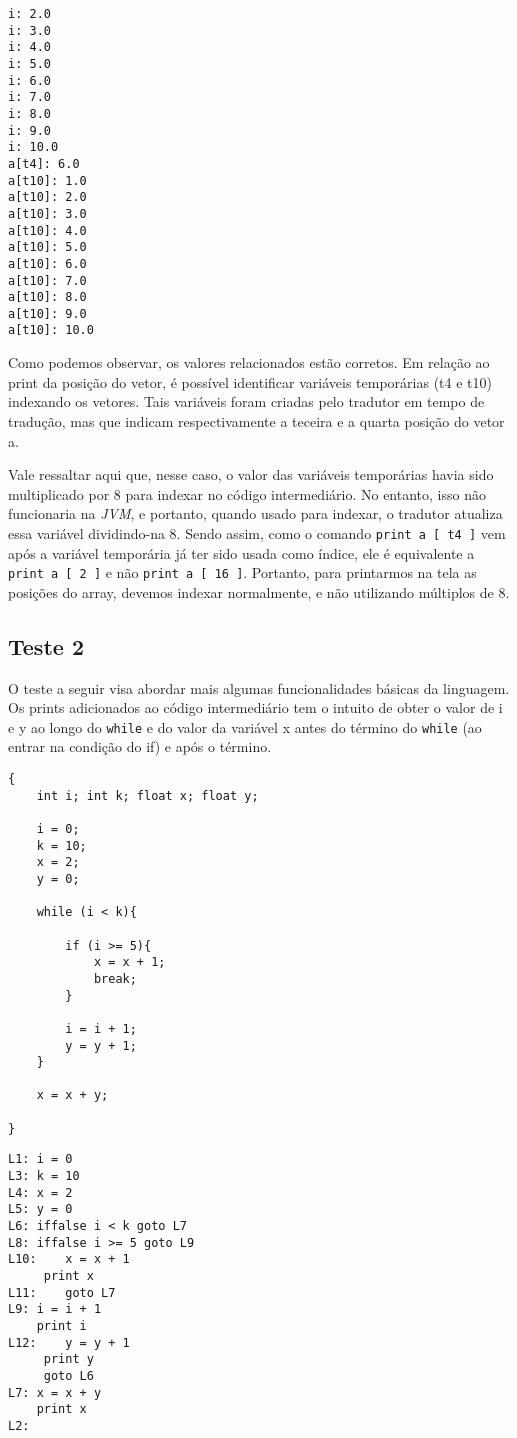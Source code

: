 \begin{lstlisting}[caption=\textbf{Saída após rodar o binário}]
i: 2.0
i: 3.0
i: 4.0
i: 5.0
i: 6.0
i: 7.0
i: 8.0
i: 9.0
i: 10.0
a[t4]: 6.0
a[t10]: 1.0
a[t10]: 2.0
a[t10]: 3.0
a[t10]: 4.0
a[t10]: 5.0
a[t10]: 6.0
a[t10]: 7.0
a[t10]: 8.0
a[t10]: 9.0
a[t10]: 10.0
\end{lstlisting}

Como podemos observar, os valores relacionados estão corretos. Em relação ao print da posição do vetor, é possível identificar variáveis temporárias (t4 e t10) indexando os vetores. Tais variáveis foram criadas pelo tradutor em tempo de tradução, mas que indicam respectivamente a teceira e a quarta posição do vetor a.

Vale ressaltar aqui que, nesse caso, o valor das variáveis temporárias havia sido multiplicado por 8 para indexar no código intermediário. No entanto, isso não funcionaria na \textit{JVM}, e portanto, quando usado para indexar, o tradutor atualiza essa variável dividindo-na 8. Sendo assim, como o comando \texttt{print a [ t4 ]} vem após a variável temporária já ter sido usada como índice, ele é equivalente a \texttt{print a [ 2 ]} e não \texttt{print a [ 16 ]}. Portanto, para printarmos na tela as posições do array, devemos indexar normalmente, e não utilizando múltiplos de 8.


\subsection{Teste 2}

O teste a seguir visa abordar mais algumas funcionalidades básicas da linguagem. Os prints adicionados ao código intermediário tem o intuito de obter o valor de i e y ao longo do \texttt{while} e do valor da variável x antes do término do \texttt{while} (ao entrar na condição do if) e após o término.

\begin{lstlisting}[caption=\textbf{Arquivo para o teste 2 em linguagem SmallL}]
{
	int i; int k; float x; float y;

	i = 0;
	k = 10;
	x = 2;
	y = 0;

	while (i < k){

		if (i >= 5){
			x = x + 1;
			break;
		}

		i = i + 1;
		y = y + 1;
	}

	x = x + y;

}
\end{lstlisting}

\begin{lstlisting}[caption=\textbf{Arquivo com código intermediário para o teste 2 produzido pelo front-end (adicionado de comandos print "na mão")}]
L1:	i = 0
L3:	k = 10
L4:	x = 2
L5:	y = 0
L6:	iffalse i < k goto L7
L8:	iffalse i >= 5 goto L9
L10:	x = x + 1
     print x
L11:	goto L7
L9:	i = i + 1
    print i
L12:	y = y + 1
     print y
     goto L6
L7:	x = x + y
    print x
L2:
\end{lstlisting}

